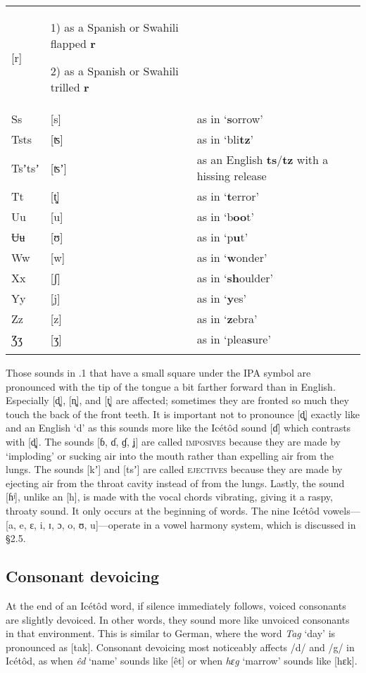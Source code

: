 \begin{table}
\begin{tabularx}{\textwidth}{XXX}
[r] & 1) as a Spanish or Swahili flapped \textbf{r}

2) as a Spanish or Swahili trilled \textbf{r}\\
Ss & [s] & as in ‘\textbf{s}orrow’\\
Tsts & [ʦ] & as in ‘bli\textbf{tz}’\\
Tsʼtsʼ & [ʦʼ] & as an English \textbf{ts}/\textbf{tz} with a hissing release\\
Tt & [t̻] & as in ‘\textbf{t}error’\\
Uu & [u] & as in ‘b\textbf{oo}t’\\
Ʉʉ & [ʊ] & as in ‘p\textbf{u}t’\\
Ww & [w] & as in ‘\textbf{w}onder’\\
Xx & [ʃ] & as in ‘\textbf{sh}oulder’\\
Yy & [j] & as in ‘\textbf{y}es’\\
Zz & [z] & as in ‘\textbf{z}ebra’\\
Ʒʒ & [ʒ] & as in ‘plea\textbf{s}ure’\\
\lspbottomrule
\end{tabularx}

\end{table}

Those sounds in .1 that have a small square under the IPA symbol are pronounced with the tip of the tongue a bit farther forward than in English. Especially [d̻], [n̻], and [t̻] are affected; sometimes they are fronted so much they touch the back of the front teeth. It is important not to pronounce [d̻] exactly like and an English ‘d’ as this sounds more like the Icétôd sound [ɗ] which contrasts with [d̻]. The sounds [ɓ, ɗ, ɠ, ʝ] are called \textsc{imposives} because they are made by ‘imploding’ or sucking air into the mouth rather than expelling air from the lungs. The sounds [kʼ] and [tsʼ] are called \textsc{ejectives} because they are made by ejecting air from the throat cavity instead of from the lungs. Lastly, the sound [ɦʲ], unlike an [h], is made with the vocal chords vibrating, giving it a raspy, throaty sound. It only occurs at the beginning of words. The nine Icétôd vowels—[a, e, ɛ, i, ɪ, ɔ, o, ʊ, u]—operate in a vowel harmony system, which is discussed in §2.5.
 
\subsection{Consonant devoicing}


At the end of an Icétôd word, if silence immediately follows, voiced consonants are slightly devoiced. In other words, they sound more like unvoiced consonants in that environment. This is similar to German, where the word \textit{Tag} ‘day’ is pronounced as [tak]. Consonant devoicing most noticeably affects /d/ and /g/ in Icétôd, as when \textit{êd} ‘name’ sounds like [êt] or when \textit{hɛg} ‘marrow’\textit{} sounds like [hɛk]. 
 
